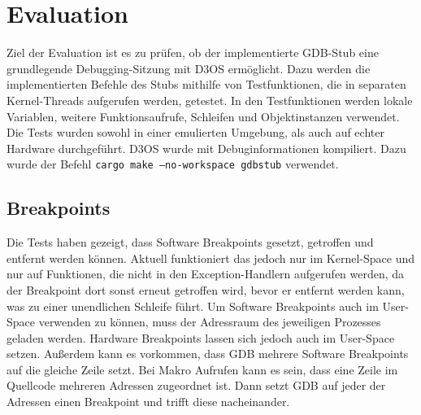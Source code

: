 \chapter{Evaluation}
Ziel der Evaluation ist es zu prüfen, ob der implementierte GDB-Stub eine grundlegende Debugging-Sitzung mit D3OS ermöglicht. Dazu werden die implementierten Befehle des Stubs mithilfe von Testfunktionen, die in separaten Kernel-Threads aufgerufen werden, getestet. In den Testfunktionen werden lokale Variablen, weitere Funktionsaufrufe, Schleifen und Objektinstanzen verwendet. Die Tests wurden sowohl in einer emulierten Umgebung, als auch auf echter Hardware durchgeführt. D3OS wurde mit Debuginformationen kompiliert. Dazu wurde der Befehl \texttt{cargo make --no-workspace gdbstub} verwendet.

\section{Breakpoints}
Die Tests haben gezeigt, dass Software Breakpoints gesetzt, getroffen und entfernt werden können. Aktuell funktioniert das jedoch nur im Kernel-Space und nur auf Funktionen, die nicht in den Exception-Handlern aufgerufen werden, da der Breakpoint dort sonst erneut getroffen wird, bevor er entfernt werden kann, was zu einer unendlichen Schleife führt. Um Software Breakpoints auch im User-Space verwenden zu können, muss der Adressraum des jeweiligen Prozesses geladen werden. Hardware Breakpoints lassen sich jedoch auch im User-Space setzen. Außerdem kann es vorkommen, dass GDB mehrere Software Breakpoints auf die gleiche Zeile setzt. Bei Makro Aufrufen kann es sein, dass eine Zeile im Quellcode mehreren Adressen zugeordnet ist. Dann setzt GDB auf jeder der Adressen einen Breakpoint und trifft diese nacheinander.

